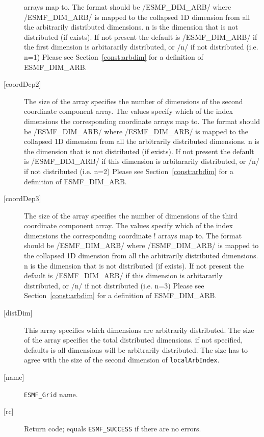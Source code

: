 \begin{description}
       arrays map to. The format should be /ESMF\_DIM\_ARB/ where
       /ESMF\_DIM\_ARB/ is mapped to the collapsed 1D dimension from all
       the arbitrarily distributed dimensions.  n is the dimension that
       is not distributed (if exists).
       If not present the default is /ESMF\_DIM\_ARB/ if the first dimension
       is arbitararily distributed, or /n/ if not distributed (i.e. n=1)
        Please see Section~\ref{const:arbdim} for a definition of ESMF\_DIM\_ARB.
   \item[{[coordDep2]}]
       The size of the array specifies the number of dimensions of the
       second coordinate component array. The values specify which
       of the index dimensions the corresponding coordinate
       arrays map to. The format should be /ESMF\_DIM\_ARB/ where
       /ESMF\_DIM\_ARB/ is mapped to the collapsed 1D dimension from all
       the arbitrarily distributed dimensions.  n is the dimension that
       is not distributed (if exists).
       If not present the default is /ESMF\_DIM\_ARB/ if this dimension
       is arbitararily distributed, or /n/ if not distributed (i.e. n=2)
       Please see Section~\ref{const:arbdim} for a definition of ESMF\_DIM\_ARB.
   \item[{[coordDep3]}]
       The size of the array specifies the number of dimensions of the
       third coordinate component array. The values specify which
       of the index dimensions the corresponding coordinate
  !     arrays map to. The format should be /ESMF\_DIM\_ARB/ where
       /ESMF\_DIM\_ARB/ is mapped to the collapsed 1D dimension from all
       the arbitrarily distributed dimensions.  n is the dimension that
       is not distributed (if exists).
       If not present the default is /ESMF\_DIM\_ARB/ if this dimension
       is arbitararily distributed, or /n/ if not distributed (i.e. n=3)
       Please see Section~\ref{const:arbdim} for a definition of ESMF\_DIM\_ARB.
   \item[{[distDim]}]
         This array specifies which dimensions are arbitrarily distributed.
         The size of the array specifies the total distributed dimensions.
         if not specified, defaults is all dimensions will be arbitrarily
         distributed.  The size has to agree with the size of the second
         dimension of {\tt localArbIndex}.
   \item[{[name]}]
            {\tt ESMF\_Grid} name.
   \item[{[rc]}]
        Return code; equals {\tt ESMF\_SUCCESS} if there are no errors.
   \end{description}
   

